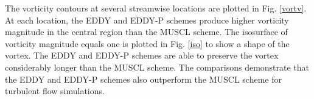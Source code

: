 The vorticity contours at several streamwise locations are plotted in Fig. \ref{vortv}. At each location, the EDDY and EDDY-P schemes produce higher vorticity magnitude in the central region than the MUSCL scheme. The isosurface of vorticity magnitude equals one is plotted in Fig. \ref{iso} to show a shape of the vortex. The EDDY and EDDY-P schemes are able to preserve the vortex considerably longer than the MUSCL scheme. The comparisons demonstrate that the EDDY and EDDY-P schemes also outperform the MUSCL scheme for turbulent flow simulations.
\begin{figure}[t]  
\centering

\end{figure}
